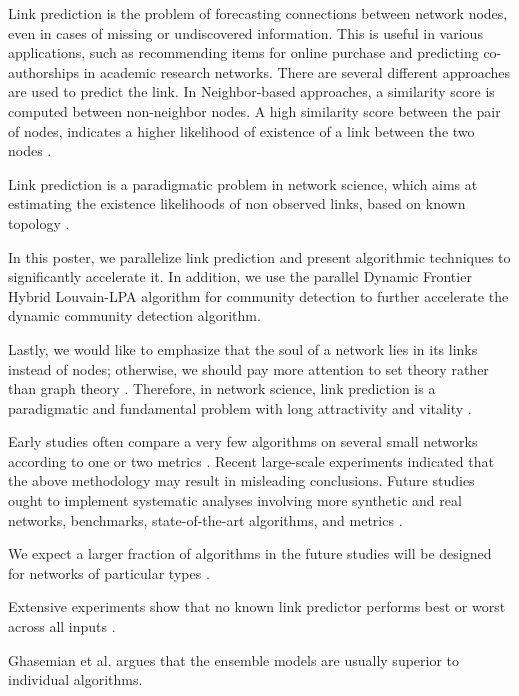 Link prediction is the problem of forecasting connections between network nodes, even in cases of missing or undiscovered information. This is useful in various applications, such as recommending items for online purchase and predicting co-authorships in academic research networks. There are several different approaches are used to predict the link. In Neighbor-based approaches, a similarity score is computed between non-neighbor nodes. A high similarity score between the pair of nodes, indicates a higher likelihood of existence of a link between the two nodes \cite{gatadi2023lpcd, wang2014link}.

Link prediction is a paradigmatic problem in network science, which aims at estimating the existence likelihoods of non observed links, based on known topology \cite{zhou2021progresses}.

In this poster, we parallelize link prediction and present algorithmic techniques to significantly accelerate it. In addition, we use the parallel Dynamic Frontier Hybrid Louvain-LPA algorithm for community detection to further accelerate the dynamic community detection algorithm.

Lastly, we would like to emphasize that the soul of a network lies in its links instead of nodes; otherwise, we should pay more attention to set theory rather than graph theory \cite{zhou2021progresses}. Therefore, in network science, link prediction is a paradigmatic and fundamental problem with long attractivity and vitality \cite{zhou2021progresses}.

Early studies often compare a very few algorithms on several small networks according to one or two metrics \cite{zhou2021progresses}. Recent large-scale experiments \cite{mara2020benchmarking, ghasemian2020stacking, muscoloni2022adaptive, muscoloni2021short, zhou2021experimental} indicated that the above methodology may result in misleading conclusions. Future studies ought to implement systematic analyses involving more synthetic and real networks, benchmarks, state-of-the-art algorithms, and metrics \cite{zhou2021progresses}.

We expect a larger fraction of algorithms in the future studies will be designed for networks of particular types \cite{zhou2021progresses}.

Extensive experiments \cite{ghasemian2020stacking} show that no known link predictor performs best or worst across all inputs \cite{zhou2021progresses}.

Ghasemian et al. \cite{ghasemian2020stacking} argues that the ensemble models are usually superior to individual algorithms.

